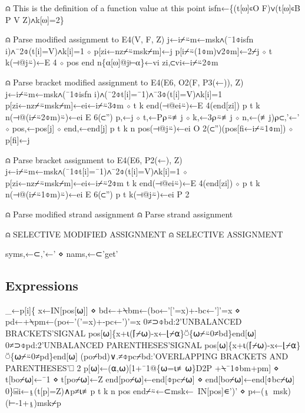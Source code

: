 \documentclass{article}%
\begin{document}
⍝ This is the definition of a function value at this point
isfn←\{(t[⍵]∊O F)∨(t[⍵]∊B P V Z)∧k[⍵]=2\}

⍝ Parse modified assignment to E4(V, F, Z)
j←i⌿⍨m←msk∧(¯1⌽isfn i)∧¯2⌽(t[i]=V)∧k[i]=1 ⋄ p[zi←nz⌿⍨msk⌿m]←j
p[i⌿⍨(1⌽m)∨2⌽m]←2⌿j ⋄ t k(⊣@j⍨)←E 4 ⋄ pos end n\{⍺[⍵]@j⊢⍺\}←vi zi,⊂vi←i⌿⍨2⌽m

⍝ Parse bracket modified assignment to E4(E6, O2(F, P3(←)), Z)
j←i⌿⍨m←msk∧(¯1⌽isfn i)∧(¯2⌽t[i]=¯1)∧¯3⌽(t[i]=V)∧k[i]=1
p[zi←nz⌿⍨msk⌿m]←ei←i⌿⍨3⌽m ⋄ t k end(⊣@ei⍨)←E 4(end[zi])
p t k n(⊣@(i⌿⍨2⌽m)⍨)←ei E 6(⊂'')
p,←j ⋄ t,←P⍴⍨≢j ⋄ k,←3⍴⍨≢j ⋄ n,←(≢j)⍴⊂,'←' ⋄ pos,←pos[j] ⋄ end,←end[j]
p t k n pos(⊣@j⍨)←ei O 2(⊂'')(pos[fi←i⌿⍨1⌽m]) ⋄ p[fi]←j

⍝ Parse bracket assignment to E4(E6, P2(←), Z)
j←i⌿⍨m←msk∧(¯1⌽t[i]=¯1)∧¯2⌽(t[i]=V)∧k[i]=1 ⋄ p[zi←nz⌿⍨msk⌿m]←ei←i⌿⍨2⌽m
t k end(⊣@ei⍨)←E 4(end[zi]) ⋄ p t k n(⊣@(i⌿⍨1⌽m)⍨)←ei E 6(⊂'')
p t k(⊣@j⍨)←ei P 2

⍝ Parse modified strand assignment
⍝ Parse strand assignment

⍝ SELECTIVE MODIFIED ASSIGNMENT
⍝ SELECTIVE ASSIGNMENT
\nwendcode{}\nwdocspar

\nwenddocs{}\plusendmoddef\nwstartdeflinemarkup{}\nwenddeflinemarkup
syms,←⊂,'←' ⋄ nams,←⊂'get'
\nwendcode{}\nwdocspar

\subsection{Expressions}

\nwenddocs{}\endmoddef\nwstartdeflinemarkup{}\nwenddeflinemarkup
_←p[i]\{
        x←IN[pos[⍵]] ⋄ bd←+⍀bm←(bo←'['=x)+-bc←']'=x ⋄ pd←+⍀pm←(po←'('=x)+-pc←')'=x
        0≠⊃⌽bd:2'UNBALANCED BRACKETS'SIGNAL pos[⍵]\{x+⍳(⌈⌿⍵)-x←⌊⌿⍺\}⍥\{⍵⌿⍨0≠bd\}end[⍵]
        0≠⊃⌽pd:2'UNBALANCED PARENTHESES'SIGNAL pos[⍵]\{x+⍳(⌈⌿⍵)-x←⌊⌿⍺\}⍥\{⍵⌿⍨0≠pd\}end[⍵]
        (po⌿bd)∨.≠⌽pc⌿bd:'OVERLAPPING BRACKETS AND PARENTHESES'⎕ 2
        p[⍵]←(⍺,⍵)[1+¯1@\{⍵=⍳≢⍵\}D2P +⍀¯1⌽bm+pm] ⋄ t[bo⌿⍵]←¯1 ⋄ t[po⌿⍵]←Z
        end[po⌿⍵]←end[⌽pc⌿⍵] ⋄ end[bo⌿⍵]←end[⌽bc⌿⍵]
0\}⌸i←⍸(t[p]=Z)∧p≠⍳≢p
t k n pos end⌿⍨←⊂msk←~IN[pos]∊')' ⋄ p←(⍸~msk)(⊢-1+⍸)msk⌿p
\nwendcode{}\nwdocspar
\end{document}
